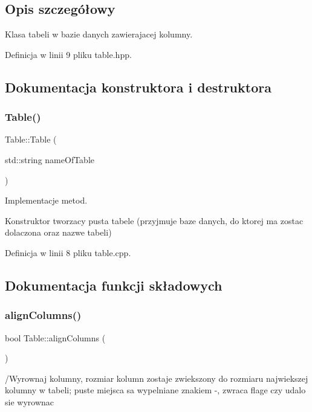 \subsection{Opis szczegółowy}
Klasa tabeli w bazie danych zawierajacej kolumny. 

Definicja w linii 9 pliku table.\+hpp.



\subsection{Dokumentacja konstruktora i destruktora}
\mbox{\label{class_table_a13c865a29586d5b4b17518ea08b9bb17}} 
\subsubsection{\texorpdfstring{Table()}{Table()}}
{\footnotesize\ttfamily Table\+::\+Table (\begin{DoxyParamCaption}\item[{std\+::string}]{name\+Of\+Table }\end{DoxyParamCaption})}



Implementacje metod. 

Konstruktor tworzacy pusta tabele (przyjmuje baze danych, do ktorej ma zostac dolaczona oraz nazwe tabeli) 

Definicja w linii 8 pliku table.\+cpp.



\subsection{Dokumentacja funkcji składowych}
\mbox{\label{class_table_a33f193d8b41d0f262bbd6fbcea777301}} 
\subsubsection{\texorpdfstring{align\+Columns()}{alignColumns()}}
{\footnotesize\ttfamily bool Table\+::align\+Columns (\begin{DoxyParamCaption}{ }\end{DoxyParamCaption})}

/\+Wyrownaj kolumny, rozmiar kolumn zostaje zwiekszony do rozmiaru najwiekszej kolumny w tabeli; puste miejsca sa wypelniane znakiem \textquotesingle{}-\/\textquotesingle{}, zwraca flage czy udalo sie wyrownac 

